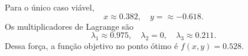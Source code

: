 \documentclass[11pt,a4paper]{article}
\begin{document}
\begin{enumerate}
\begin{itemize}
\begin{enumerate}[label=\roman*]
            \end{enumerate}
            Para o único caso viável, 
            \begin{equation*}
                x \approx 0.382, \quad y = \approx -0.618.
            \end{equation*}
            Os multiplicadores de Lagrange são
            \begin{equation*}
                \lambda_1 \approx 0.975, \quad \lambda_2 = 0, \quad \lambda_3 \approx 0.211.
            \end{equation*}
            Dessa força, a função objetivo no ponto ótimo é $f(x,y) = 0.528$.
        \end{itemize}
\end{enumerate}
\end{document}
